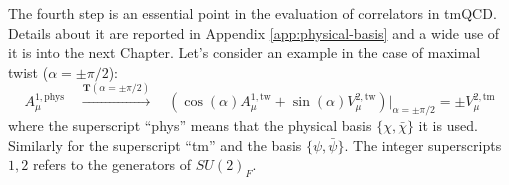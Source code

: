 \documentclass[english, LaM, oneside, noexaminfo]{sapthesis}
\begin{document}
\noindent
The fourth step is an essential point in the evaluation of correlators in tmQCD.
Details about it are reported in Appendix \ref{app:physical-basis} and a wide use of it is into the next Chapter.
Let's consider an example in the case of maximal twist ($\alpha = \pm\pi/2$):
\begin{equation*}
    A_\mu^{1,\text{phys}} \quad \xrightarrow{\mathbf{T}(\alpha = \pm\pi/2)} \quad \left( \cos (\alpha) A_\mu^{1,\text{tw}} + \sin (\alpha) V_\mu^{2,\text{tw}}\right)\bigg|_{\alpha = \pm\pi/2} = \pm V_\mu^{2,\text{tm}}
\end{equation*}
where the superscript ``phys'' means that the physical basis $\{\chi,\bar \chi\}$ it is used. Similarly for the superscript ``tm'' and the basis $\{\psi,\bar\psi\}$.
The integer superscripts $1,2$ refers to the generators of $SU(2)_F$.
\end{document}
